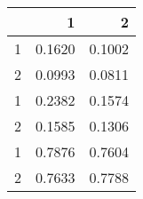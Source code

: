 \begin{tabular}{lrr}
\toprule
{} &       1 &       2 \\
\midrule
1 &  0.1620 &  0.1002 \\
2 &  0.0993 &  0.0811 \\
1 &  0.2382 &  0.1574 \\
2 &  0.1585 &  0.1306 \\
1 &  0.7876 &  0.7604 \\
2 &  0.7633 &  0.7788 \\
\bottomrule
\end{tabular}
